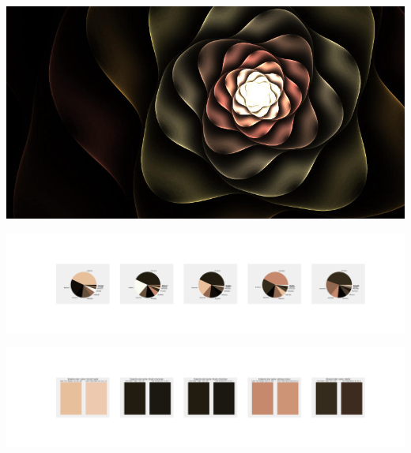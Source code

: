 \documentclass[11pt]{article}
\begin{document}
\begin{landscape}
    \begin{center}
    \includegraphics[width=\textwidth]{./nbimg/file (38).jpg}
    \end{center}

    \begin{center}
    \includegraphics[width=250mm]{./nbimg/pie-311.jpg}
    \end{center}

    \begin{center}
    \includegraphics[width=250mm]{./nbimg/peak-311.jpg}
    \end{center}
    


\end{landscape}
\end{document}
